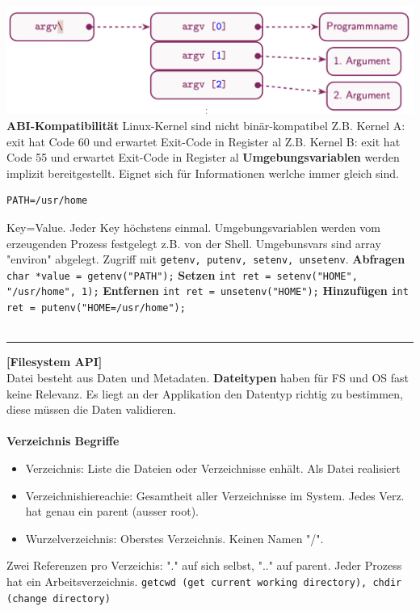 \documentclass[8pt]{extarticle}
\let\oldtextbf\textbf
\renewcommand{\textbf}{\tiny\oldtextbf}
\begin{document}
\begin{multicols*}{5}
	\includegraphics[scale=0.24]{Programmargumente.png}
	\textbf{ABI-Kompatibilität} Linux-Kernel sind nicht binär-kompatibel Z.B. Kernel A: exit hat Code 60 und erwartet Exit-Code in Register al Z.B. Kernel B: exit hat Code 55 und erwartet Exit-Code in Register al
	\textbf{Umgebungsvariablen} werden implizit bereitgestellt. Eignet sich für Informationen werlche immer gleich sind.
	\begin{lstlisting}
PATH=/usr/home
	\end{lstlisting}
	Key=Value. Jeder Key höchstens einmal. Umgebungsvariablen werden vom erzeugenden Prozess festgelegt z.B. von der Shell. Umgebunsvars sind array "environ" abgelegt. Zugriff mit \texttt{getenv, putenv, setenv, unsetenv}.
	\textbf{Abfragen} \texttt{char *value = getenv("PATH");}
	\textbf{Setzen} \texttt{int ret = setenv("HOME", "/usr/home", 1);}
	\textbf{Entfernen} \texttt{int ret = unsetenv("HOME");}
	\textbf{Hinzufügen} \texttt{int ret = putenv("HOME=/usr/home");}\\\\
	\rule{\linewidth}{0.4pt}
	\textbf{[Filesystem API]}\\
	Datei besteht aus Daten und Metadaten.
	\textbf{Dateitypen} haben für FS und OS fast keine Relevanz. Es liegt an der Applikation den Datentyp richtig zu bestimmen, diese müssen die Daten validieren.\\\\
	\textbf{Verzeichnis Begriffe}
	\begin{itemize}[noitemsep, topsep=0pt, leftmargin=*]
		\item Verzeichnis: Liste die Dateien oder Verzeichnisse enhält. Als Datei realisiert
		\item Verzeichnishiereachie: Gesamtheit aller Verzeichnisse im System. Jedes Verz. hat genau ein parent (ausser root).
		\item Wurzelverzeichnis: Oberstes Verzeichnis. Keinen Namen "/".
	\end{itemize}
	Zwei Referenzen pro Verzeichis: "." auf sich selbst, ".." auf parent. Jeder Prozess hat ein Arbeitsverzeichnis. \texttt{getcwd (get current working directory), chdir (change directory)}\\\\

\end{multicols*}
\end{document}

